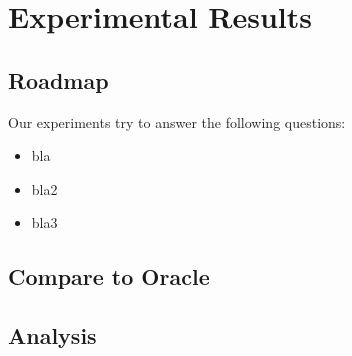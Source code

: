 \section{Experimental Results}


\subsection{Roadmap}
Our experiments try to answer the following questions:

\begin{itemize}
\item bla
\item bla2
\item bla3
\end{itemize}




\subsection{Compare to Oracle}


\subsection{Analysis}

